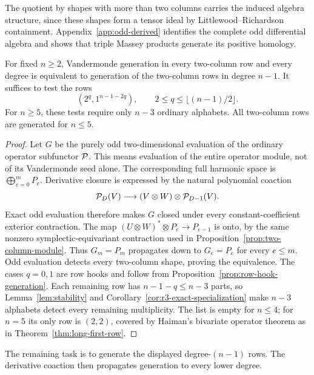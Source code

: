 The quotient by shapes with more than two columns carries the induced
algebra structure, since these shapes form a tensor ideal by
Littlewood--Richardson containment.
Appendix~\ref{app:odd-derived} identifies the complete odd differential
algebra and shows that triple Massey products generate its positive
homology.

\begin{proposition}
\label{prop:two-column-middle-test}
For fixed $n\ge2$, Vandermonde generation in every two-column row and
every degree is equivalent to generation of the two-column rows in
degree $n-1$. It suffices to test the rows
\[
             (2^q,1^{n-1-2q}),
       \qquad 2\le q\le\lfloor(n-1)/2\rfloor.
\]
For $n\ge5$, these tests require only $n-3$ ordinary alphabets.
All two-column rows are generated for $n\le5$.
\end{proposition}
\begin{proof}
Let $G$ be the purely odd two-dimensional evaluation of the ordinary
operator subfunctor $\mathcal P$. This means evaluation of the entire
operator module, not of its Vandermonde seed alone.
The corresponding full harmonic space is
$\bigoplus_{e=0}^mP_e$.
Derivative closure is expressed by the natural polynomial coaction
\[
 \mathcal P_D(V)\longrightarrow
            (V\otimes W)\otimes\mathcal P_{D-1}(V).
\]
Exact odd evaluation therefore makes $G$ closed under every
constant-coefficient exterior contraction.
The map $(U\otimes W)^*\otimes P_e\to P_{e-1}$ is onto, by the
same nonzero symplectic-equivariant contraction used in
Proposition~\ref{prop:two-column-module}.
Thus $G_m=P_m$ propagates down to $G_e=P_e$ for every $e\le m$.
Odd evaluation detects every two-column shape, proving the
equivalence. The cases $q=0,1$ are row hooks and follow from
Proposition~\ref{prop:row-hook-generation}. Each remaining row has
$n-1-q\le n-3$ parts, so Lemma~\ref{lem:stability} and
Corollary~\ref{cor:r3-exact-specialization} make $n-3$ alphabets
detect every remaining multiplicity. The list is empty for $n\le4$;
for $n=5$ its only row is $(2,2)$, covered by Haiman's bivariate
operator theorem as in Theorem~\ref{thm:long-first-row}.
\end{proof}

The remaining task is to generate the displayed degree-$(n-1)$ rows.
The derivative coaction then propagates generation to every lower degree.
